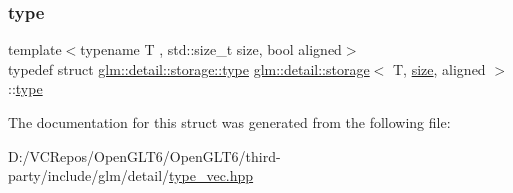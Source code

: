\subsubsection{\texorpdfstring{type}{type}}
{\footnotesize\ttfamily template$<$typename T , std\+::size\+\_\+t size, bool aligned$>$ \\
typedef struct \mbox{\hyperlink{structglm_1_1detail_1_1storage_1_1type}{glm\+::detail\+::storage\+::type}}  \mbox{\hyperlink{structglm_1_1detail_1_1storage}{glm\+::detail\+::storage}}$<$ T, \mbox{\hyperlink{glad_8h_a79ef9eb3e59c4bb34c4b9fbeb8d28ff7}{size}}, aligned $>$\+::\mbox{\hyperlink{structglm_1_1detail_1_1storage_1_1type}{type}}}



The documentation for this struct was generated from the following file\+:\begin{DoxyCompactItemize}
\item 
D\+:/\+V\+C\+Repos/\+Open\+G\+L\+T6/\+Open\+G\+L\+T6/third-\/party/include/glm/detail/\mbox{\hyperlink{type__vec_8hpp}{type\+\_\+vec.\+hpp}}\end{DoxyCompactItemize}
